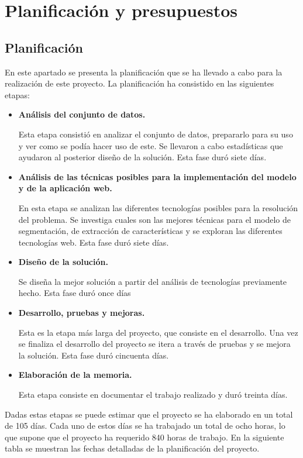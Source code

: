 \documentclass[12pt]{report} %
\begin{document}
	\chapter{Planificación y presupuestos}

	\section{Planificación}


	En este apartado se presenta la planificación que se ha llevado a cabo para la realización de este proyecto.
	La planificación ha consistido en las siguientes etapas:
	\begin{itemize}
		\item \textbf{Análisis del conjunto de datos.} 
		
		Esta etapa consistió en analizar el conjunto de datos, prepararlo para su uso y ver como se podía hacer uso de este. Se
		llevaron a cabo estadísticas que ayudaron al posterior diseño de la solución. Esta fase duró siete días.
		\item \textbf{Análisis de las técnicas posibles para la implementación del modelo y de la aplicación web.} 
		
		En esta etapa se analizan las diferentes tecnologías posibles para la resolución del problema. Se investiga
		cuales son las mejores técnicas para el modelo de segmentación, de extracción de características y se exploran las diferentes tecnologías web.
		Esta fase duró siete días.
		\item \textbf{Diseño de la solución.} 
		
		Se diseña la mejor solución a partir del análisis de tecnologías previamente hecho. Esta fase duró once días
		\item \textbf{Desarrollo, pruebas y mejoras.}
		
		Esta es la etapa más larga del proyecto, que consiste en el desarrollo. Una vez se finaliza el desarrollo
		del proyecto se itera a través de pruebas y se mejora la solución. 
		Esta fase duró cincuenta días.
		\item \textbf{Elaboración de la memoria.}
		
		Esta etapa consiste en documentar el trabajo realizado y duró treinta días.
	\end{itemize}

	Dadas estas etapas se puede estimar que el proyecto se ha elaborado en un total de 105 días. Cada uno de estos días se ha trabajado un total de
	ocho horas, lo que supone que el proyecto ha requerido 840 horas de trabajo. En la siguiente tabla se muestran las fechas detalladas
	de la planificación del proyecto.
\end{document}
